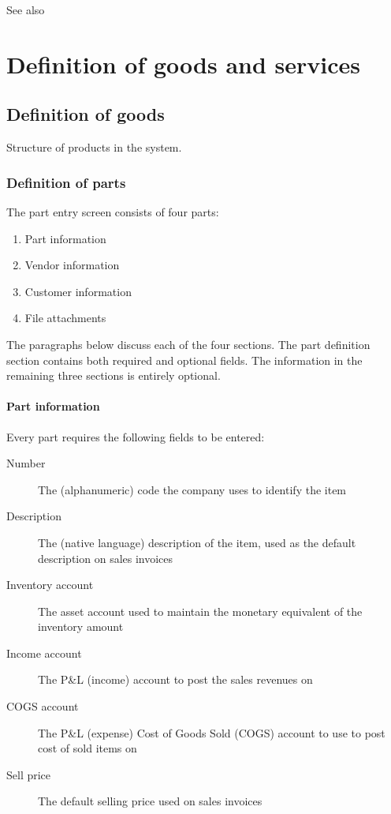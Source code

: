 See also 

\chapter{Definition of goods and services}
\label{cha-products-definition}


\section{Definition of goods}
\label{sec-products-definition-goods}

Structure of products in the system.

\subsection{Definition of parts}
\label{subsec-products-parts-definition}

The part entry screen consists of four parts:

\begin{enumerate}
\item Part information
\item Vendor information
\item Customer information
\item File attachments
\end{enumerate}


The paragraphs below discuss each of the four sections. The part definition section
contains both required and optional fields. The information in the remaining
three sections is entirely optional.

\subsubsection{Part information}
\label{subsubsec-parts-information}

Every part requires the following fields to be entered:

\begin{description}
\item [Number] The (alphanumeric) code the company uses to identify the item
\item [Description] The (native language) description of the item, used as the default
        description on sales invoices
\item [Inventory account] The asset account used to maintain the monetary equivalent
        of the inventory amount
\item [Income account] The P\&L (income) account to post the sales revenues on
\item [COGS account] The P\&L (expense) Cost of Goods Sold (COGS) account to use
        to post cost of sold items on
\item [Sell price] The default selling price used on sales invoices
\end{description}


